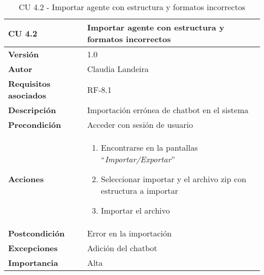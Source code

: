 \begin{table}[p]
	\centering
	\begin{tabularx}{\linewidth}{ p{} p{} }
		\toprule
		\textbf{CU 4.2}    & \textbf{Importar agente con estructura y formatos incorrectos}\\
		\toprule
		\textbf{Versión}              & 1.0    \\
		\textbf{Autor}                & Claudia Landeira \\
		\textbf{Requisitos asociados} & RF-8.1\\
		\textbf{Descripción}          & Importación errónea de chatbot en el sistema\\
		\textbf{Precondición}         & Acceder con sesión de usuario\\
		\textbf{Acciones}             &
		\begin{enumerate}
			\def\labelenumi{\arabic{enumi}.}
			\tightlist
                \item Encontrarse en la pantallas ``\textit{Importar/Exportar}''
			\item Seleccionar importar y el archivo zip con estructura a importar
			\item Importar el archivo
		\end{enumerate}\\
		\textbf{Postcondición}        & Error en la importación \\
		\textbf{Excepciones}          & Adición del chatbot \\
		\textbf{Importancia}          & Alta \\
		\bottomrule
	\end{tabularx}
	\caption{CU 4.2 - Importar agente con estructura y formatos incorrectos}
\end{table}

